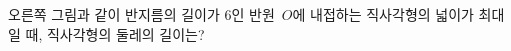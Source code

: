 \noindent\begin{minipage}[t]{0.58\linewidth}\vspace{0pt}\raggedright 오른쪽 그림과 같이 반지름의 길이가 $6$인 반원~$O$에 내접하는 직사각형의 넓이가 최대일 때, 직사각형의 둘레의 길이는?\end{minipage}\hfill\begin{minipage}[t]{0.4\linewidth}\vspace{0pt}\centering \resizebox{\ifdim\width>\linewidth\linewidth\else\width\fi}{!}{}\end{minipage}\par
{}
